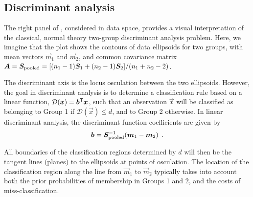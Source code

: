 \subsection{Discriminant analysis}
The right panel of , considered in data space, provides a 
visual interpretation of the classical, normal theory two-group discriminant analysis problem.
Here, we imagine that the plot shows the contours of data ellipsoids for two groups,
with mean vectors $\vec{m}_1$ and $\vec{m}_2$, and common covariance matrix
$\bm{A} = \bm{S}_{\textrm{pooled}} = [ (n_1 -1)\bm{S}_1 + (n_2 -1)\bm{S}_2 ] / (n_1 +n_2 -2) $.

The discriminant axis is the locus osculation between the two ellipsoids. However, 
the goal in discriminant analysis is to determine a classification rule based on
a linear function, $\mathcal{D}(\bm{x}) = \bm{b}^\mathsf{T} \bm{x}$, such that
an observation $\vec{x}$ will be classified as belonging to Group 1 if
$\mathcal{D}(\vec{x}) \le d$, and to Group 2 otherwise.  In linear discriminant
analysis, the discriminant function coefficients are
given by
\begin{equation*}
\bm{b} = \bm{S}_{\textrm{pooled}}^{-1} ( \bm{m}_1 - \bm{m}_2 ) \:\: .
\end{equation*}

All boundaries
of the classification regions determined by $d$
will then be the tangent lines (planes) to the ellipsoids at points of osculation.
The location of the classification region along the line from $\vec{m}_1$ to $\vec{m}_2$
typically takes into account both the
prior probabilities of membership in Groups 1 and 2, and the costs of miss-classification.





